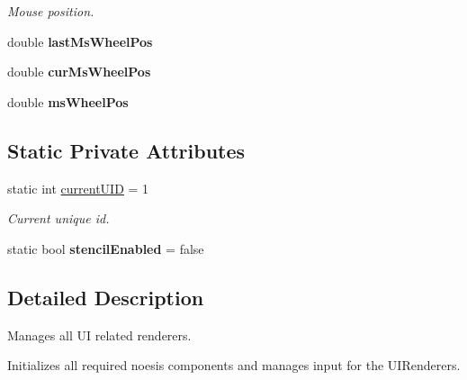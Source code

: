 \begin{DoxyCompactItemize}
\begin{DoxyCompactList}\small\item\em Mouse position. \end{DoxyCompactList}\item 
\hypertarget{class_u_i_system_a7772c89c41305eddb51133916908a33d}{double {\bfseries last\-Ms\-Wheel\-Pos}}\label{class_u_i_system_a7772c89c41305eddb51133916908a33d}

\item 
\hypertarget{class_u_i_system_a73ad35f216be30560290a1870caf9c67}{double {\bfseries cur\-Ms\-Wheel\-Pos}}\label{class_u_i_system_a73ad35f216be30560290a1870caf9c67}

\item 
\hypertarget{class_u_i_system_aaf09f639ae523ee3d7ba186951518ec8}{double {\bfseries ms\-Wheel\-Pos}}\label{class_u_i_system_aaf09f639ae523ee3d7ba186951518ec8}

\end{DoxyCompactItemize}
\subsection*{Static Private Attributes}
\begin{DoxyCompactItemize}
\item 
\hypertarget{class_u_i_system_afa67c850ac0fcebe6d5ce507c2b8fb0b}{static int \hyperlink{class_u_i_system_afa67c850ac0fcebe6d5ce507c2b8fb0b}{current\-U\-I\-D} = 1}\label{class_u_i_system_afa67c850ac0fcebe6d5ce507c2b8fb0b}

\begin{DoxyCompactList}\small\item\em Current unique id. \end{DoxyCompactList}\item 
\hypertarget{class_u_i_system_aafd55f203f9f504076c5e6cdcc5d3062}{static bool {\bfseries stencil\-Enabled} = false}\label{class_u_i_system_aafd55f203f9f504076c5e6cdcc5d3062}

\end{DoxyCompactItemize}


\subsection{Detailed Description}
Manages all U\-I related renderers. 

Initializes all required noesis components and manages input for the U\-I\-Renderers. 


